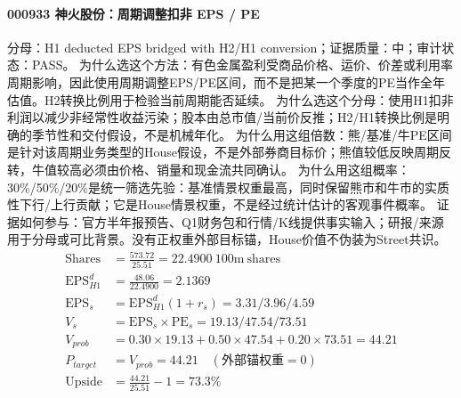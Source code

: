 \paragraph{000933 神火股份：周期调整扣非 EPS / PE}
分母：H1 deducted EPS bridged with H2/H1 conversion；证据质量：中；审计状态：PASS。
为什么选这个方法：有色金属盈利受商品价格、运价、价差或利用率周期影响，因此使用周期调整EPS/PE区间，而不是把某一个季度的PE当作全年估值。H2转换比例用于检验当前周期能否延续。
为什么选这个分母：使用H1扣非利润以减少非经常性收益污染；股本由总市值/当前价反推；H2/H1转换比例是明确的季节性和交付假设，不是机械年化。
为什么用这组倍数：熊/基准/牛PE区间是针对该周期业务类型的House假设，不是外部券商目标价；熊值较低反映周期反转，牛值较高必须由价格、销量和现金流共同确认。
为什么用这组概率：30\%/50\%/20\%是统一筛选先验：基准情景权重最高，同时保留熊市和牛市的实质性下行/上行贡献；它是House情景权重，不是经过统计估计的客观事件概率。
证据如何参与：官方半年报预告、Q1财务包和行情/K线提供事实输入；研报/来源用于分母或可比背景。没有正权重外部目标锚，House价值不伪装为Street共识。
\begin{align*}
\mathrm{Shares} &= \frac{573.72}{25.51}=22.4900\ \mathrm{100m\ shares}\\
\mathrm{EPS}_{H1}^d &= \frac{48.06}{22.4900}=2.1369\\
\mathrm{EPS}_s &= \mathrm{EPS}_{H1}^d(1+r_s)=3.31/3.96/4.59\\
V_s &= \mathrm{EPS}_s\times \mathrm{PE}_s=19.13/47.54/73.51\\
V_{prob} &= 0.30\times 19.13+0.50\times 47.54+0.20\times 73.51=44.21\\
P_{target} &= V_{prob}=44.21\quad(\text{外部锚权重}=0)\\
\mathrm{Upside} &= \frac{44.21}{25.51}-1=73.3\%\\
\end{align*}

